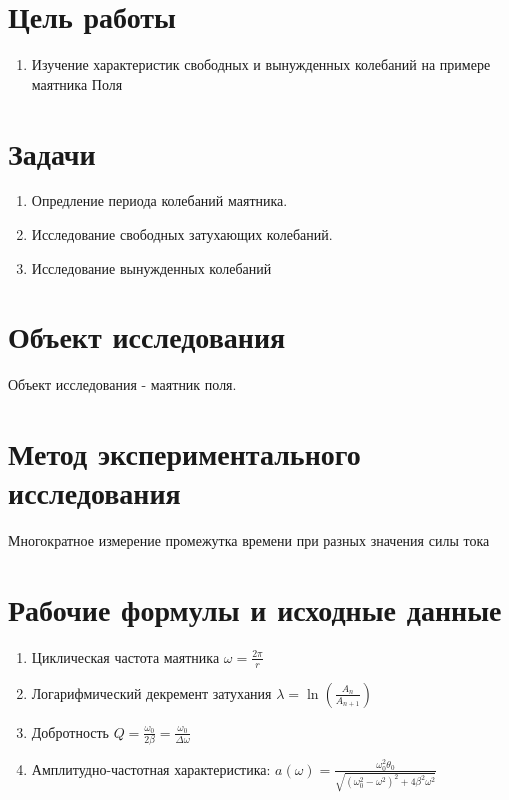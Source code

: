 \section{Цель работы}
\begin{enumerate}
    \item Изучение характеристик свободных и вынужденных колебаний на примере маятника Поля
\end{enumerate}

\section{Задачи}
\begin{enumerate}
  \item Опредление периода колебаний маятника.
  \item Исследование свободных затухающих колебаний.
  \item Исследование вынужденных колебаний
\end{enumerate}

\section{Объект исследования}
Объект исследования - маятник поля.

\section{Метод экспериментального исследования}
Многократное измерение промежутка времени при разных значения силы тока

\section{Рабочие формулы и исходные данные}
\begin{enumerate}
  \item Циклическая частота маятника $\omega = \frac{2\pi}{r}$
  \item Логарифмический декремент затухания $\lambda = \ln \left( \frac{A_n}{A_{n+1}} \right)$
  \item Добротность $Q = \frac{\omega_0}{2 \beta} = \frac{\omega_0}{\Delta \omega}$
  \item Амплитудно-частотная характеристика:
    $ a(\omega) = \frac{\omega_0^2 \theta_0}{\sqrt{(\omega_0^2 - \omega^2)^2 + 4 \beta^2 \omega^2}} $
\end{enumerate}

